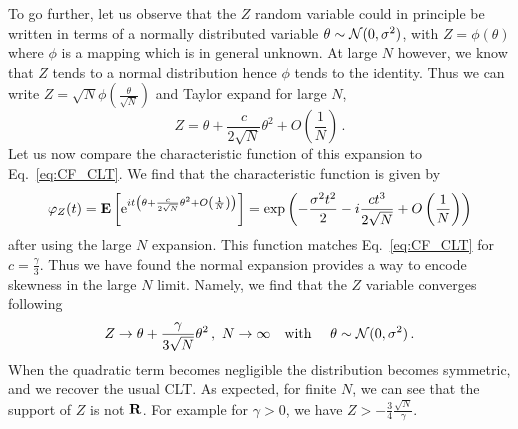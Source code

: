 \documentclass[11pt]{article}
\newcommand{\be}{\begin{equation}}
\newcommand{\ee}{\end{equation}}
\begin{document}
To go further, let us observe that the $Z$ random variable could in principle be written in terms of a normally distributed variable $\theta\sim {\cal N}(0,\sigma^2)$,
 with $Z=\phi(\theta)$ where $\phi$ is a mapping which is in general unknown.  At large $N$ however, we know that $Z$ tends to a normal distribution hence $\phi$ tends to the identity. Thus we can write $Z=\sqrt{N}\phi\left(\frac{\theta}{\sqrt{N}}\right)$ and Taylor expand for large $N$,
\be
Z=\theta+\frac{c}{2\sqrt{N}}\theta^2+O\left(\frac{1}{N}\right)\,.
\ee
Let us now compare the characteristic function of  this expansion to Eq.~\eqref{eq:CF_CLT}.
We find that the characteristic function is given by
\be
\varphi_Z(t)={\bf E} \left[ \mathrm{e}^{it \left(\theta+\frac{c}{2\sqrt{N}}\theta^2+O\left(\frac{1}{N}\right)\right)} \right]
=\exp\left(-\frac{\sigma^2 t^2}{2}-i \frac{c t^3}{ 2 \sqrt{N}} +O\left(\frac{1}{N}\right)\right)
\label{eq:CF_exp}
\ee
after using the large $N$ expansion. This function matches Eq.~\eqref{eq:CF_CLT} for $c=\frac{\gamma}{3}$. Thus we have found the normal expansion provides a way to encode skewness in the large $N$ limit. Namely, we find that the $Z$ variable converges following
\be
Z\rightarrow \theta+\frac{\gamma}{3\sqrt{N}}\theta^2\,,\,\,N\rightarrow \infty  \quad \textrm{with } \quad \theta\sim{\cal N}(0,\sigma^2)\,.
\ee
When the quadratic term becomes negligible the distribution becomes symmetric, and we recover the usual CLT.
As expected, for finite $N$, we can see that  the support of $Z$ is not $\bf R$. For example for $\gamma>0$, we have
$Z>-\frac{3}{4}\frac{\sqrt{N}}{\gamma}$.







\end{document}
